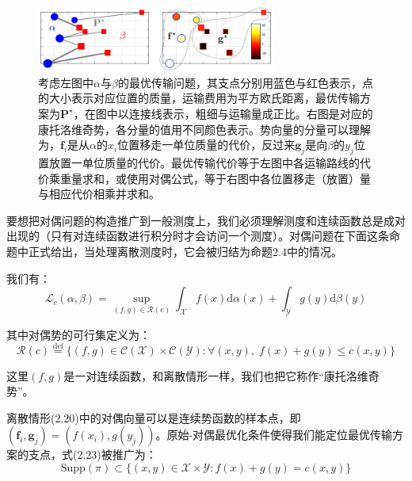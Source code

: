 \documentclass[cn,10pt,math=newtx,citestyle=gb7714-2015,bibstyle=gb7714-2015]{elegantbook}
\begin{document}
\begin{figure}[H]
    \centering
    \includegraphics[width=0.7\textwidth]{figure/fig2.8.png}
    \caption{考虑左图中$\alpha$与$\beta$的最优传输问题，其支点分别用蓝色与红色表示，点的大小表示对应位置的质量，运输费用为平方欧氏距离，最优传输方案为$\mathbf{P}^\star$，在图中以连接线表示，粗细与运输量成正比。右图是对应的康托洛维奇势，各分量的值用不同颜色表示。势向量的分量可以理解为，$\mathbf{f}_i$是从$\alpha$的$x_i$位置移走一单位质量的代价，反过来$\mathbf{g}_j$是向$\beta$的$y_j$位置放置一单位质量的代价。最优传输代价等于左图中各运输路线的代价乘重量求和，或使用对偶公式，等于右图中各位置移走（放置）量与相应代价相乘并求和。}
    \label{图2.8}
\end{figure}

\begin{postulate}[一般测度的对偶问题]
要想把对偶问题的构造推广到一般测度上，我们必须理解测度和连续函数总是成对出现的（只有对连续函数进行积分时才会访问一个测度）。对偶问题在下面这条命题中正式给出，当处理离散测度时，它会被归结为命题2.4中的情况。
\end{postulate}

\begin{proposition}
我们有：
\begin{equation}
    \label{2.24}
    \mathcal{L}_c(\alpha,\beta)=\sup\limits_{(f,g)\in\mathcal{R}(c)} \int_\mathcal{X}f(x)\text{d}\alpha(x)+\int_\mathcal{Y}g(y)\text{d}\beta(y)
\end{equation}

其中对偶势的可行集定义为：
\begin{equation}
    \label{2.25}
    \mathcal{R}(c)\overset{\text{def}}{=}\{ (f,g)\in\mathcal{C(X)}\times \mathcal{C(Y)}: \forall (x,y),\;f(x)+g(y)\leq c(x,y) \}
\end{equation}

这里$(f,g)$是一对连续函数，和离散情形一样，我们也把它称作“康托洛维奇势”。
\end{proposition}

离散情形(2.20)中的对偶向量可以是连续势函数的样本点，即$(\mathbf{f}_i,\mathbf{g}_j)=(f(x_i),g(y_j))$。原始-对偶最优化条件使得我们能定位最优传输方案的支点，式(2.23)被推广为：
\begin{equation}
    \label{2.26}
    \text{Supp}(\pi)\subset \{ (x,y)\in\mathcal{X}\times \mathcal{Y}: f(x)+g(y)=c(x,y) \}
\end{equation}
\end{document}
